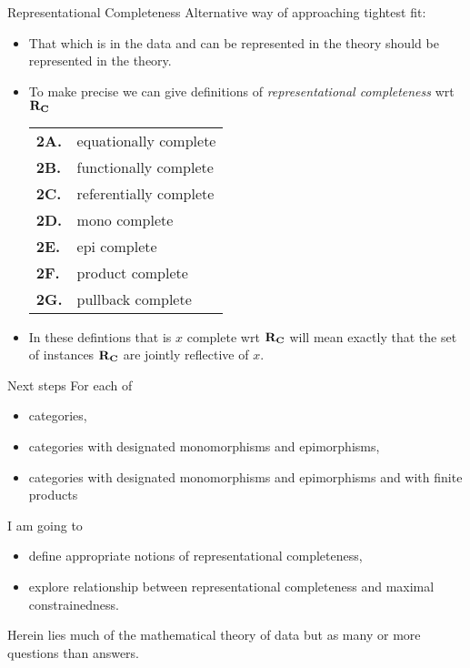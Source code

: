 \begin{frame}{Representational Completeness}
Alternative way of approaching tightest fit:
\begin{itemize}
\item That which is in the data and can be represented in the theory should be represented in the theory.
\item To make precise we can give definitions
 of \textit{representational completeness} wrt $\textbf{R}_{\textbf{C}}$ 
\begin{center}
\begin{tabular}{>{\bfseries}l l} 
2A. & equationally complete   \\
2B. & functionally complete   \\
2C. & referentially complete  \\
2D. & mono complete           \\
2E. & epi complete            \\
2F. & product complete        \\
2G. & pullback complete       \\
\end{tabular}
\end{center}
\pause \item In these defintions that \catcw is $x$ complete wrt $\textbf{R}_{\textbf{C}}$ will mean exactly that the set of instances $\textbf{R}_{\textbf{C}}$ are jointly reflective of $x$.
\end{itemize}
\end{frame}

\begin{frame}{Next steps}
For each of
\begin{itemize}
\item categories,
\item categories with designated monomorphisms and epimorphisms,
\item categories with designated monomorphisms and epimorphisms and with finite products
\end{itemize}
\medskip
I am going to
\begin{itemize}
\item define appropriate notions of representational completeness,
\item explore relationship between representational completeness and maximal constrainedness.
\end{itemize}

Herein lies much of the mathematical theory of data but as many or more questions than answers.
\end{frame}


